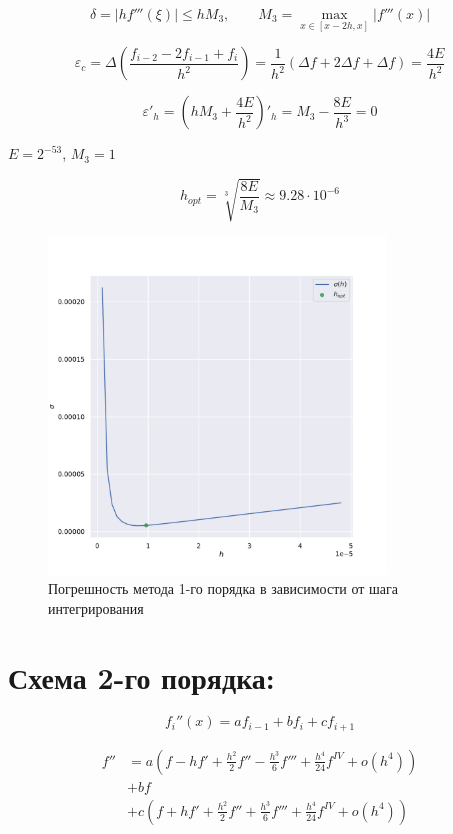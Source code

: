 \documentclass[a4paper,12pt]{article}
\begin{document}
\[
    \delta = |h f'''(\xi)|
    \le  h M_3, \qquad M_3 = \max_{x \in [x - 2h, x]}
    |f'''(x)|
\] 

\[
    \varepsilon_c = \Delta \left( \frac{f_{i - 2}
- 2 f_{i - 1} + f_{i} }{h^2} \right) 
= \frac{1}{h^2} \left( \Delta f + 2 \Delta f
+ \Delta f \right) 
= \frac{4E}{h^2}
\] 

\[
    \varepsilon'_h = \left( hM_3
    + \frac{4E}{h^2} \right)'_h
    = M_3 - \frac{8E}{h^3} = 0
\] 

\(E = 2^{-53}\), \(M_3 = 1\)

\[
   \boxed{h_{opt} = \sqrt[3]{\frac{8E}{M_3}} 
    \approx 9.28 \cdot 10^{-6}} 
\] 

\begin{figure}[htpb]
    \centering
    \includegraphics[width=0.8\textwidth]{../img/graph1.pdf}
    \caption{Погрешность метода 1-го порядка в
    зависимости от шага интегрирования}
\end{figure}

\section{Схема 2-го порядка: }

\[
    f_i''(x) = a f_{i - 1} + bf_i + c f_{i + 1}
\] 

\begin{align*}
    f'' &= a \left(f - h f' + \frac{h^2}{2}f''
    - \frac{h^3}{6}f'''
    + \frac{h^4}{24} f^{IV} + o (h^4) \right) \\
        & + bf \\
        & + c \left( f + hf' + \frac{h^2}{2}f''
    + \frac{h^3}{6}f'''
    + \frac{h^4}{24} f^{IV} + o(h^4) \right)
\end{align*}
\end{document}
